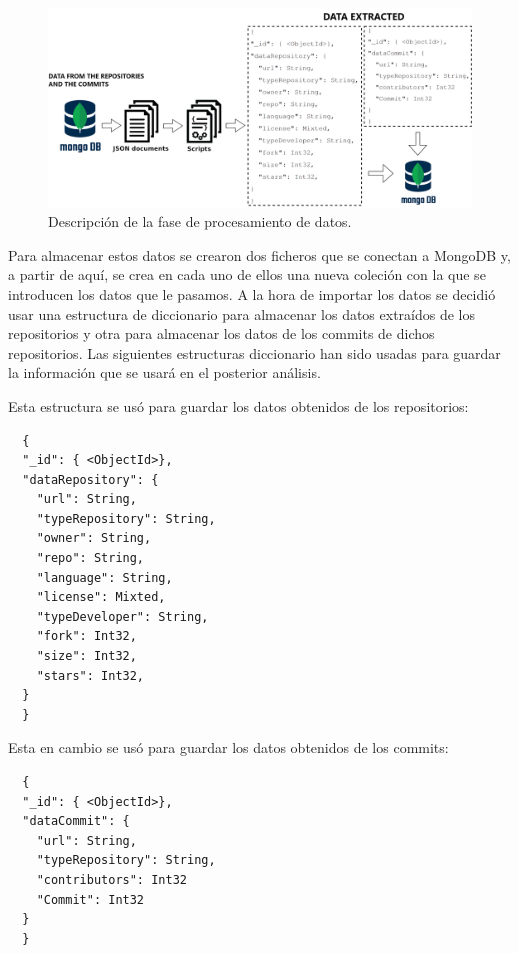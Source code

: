 \documentclass[a4paper, 12pt]{book}
\begin{document}
\begin{figure}
  \centering
  \includegraphics[width=16cm, keepaspectratio]{img/procesamiento_datos.png}
  \caption{Descripción de la fase de procesamiento de datos.}\label{fig:procesamiento_datos}
\end{figure}

Para almacenar estos datos se crearon dos ficheros que se conectan a MongoDB y, a partir de aquí, se crea en cada uno de ellos una nueva coleción con la que se introducen los datos que le pasamos.
A la hora de importar los datos se decidió usar una estructura de diccionario para almacenar los datos extraídos de los repositorios y otra para almacenar los datos de los commits de dichos repositorios.
Las siguientes estructuras diccionario han sido usadas para guardar la información que se usará en el posterior análisis. 


Esta estructura se usó para guardar los datos obtenidos de los repositorios:
{\footnotesize
\begin{verbatim}
  {
  "_id": { <ObjectId>},
  "dataRepository": {
    "url": String,
    "typeRepository": String,
    "owner": String,
    "repo": String,
    "language": String,
    "license": Mixted,
    "typeDeveloper": String,
    "fork": Int32,
    "size": Int32,
    "stars": Int32,
  }
  }
\end{verbatim}
}


Esta en cambio se usó para guardar los datos obtenidos de los commits:
{\footnotesize
\begin{verbatim}
  {
  "_id": { <ObjectId>},
  "dataCommit": {
    "url": String,
    "typeRepository": String,
    "contributors": Int32
    "Commit": Int32
  }
  }
\end{verbatim}
}
\end{document}

